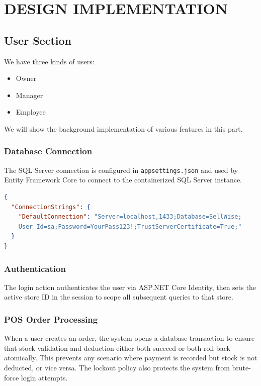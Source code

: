 \documentclass[12pt,a4paper]{report}
\begin{document}
\chapter{DESIGN IMPLEMENTATION}

\section{User Section}
We have three kinds of users:
\begin{itemize}
    \item Owner
    \item Manager
    \item Employee
\end{itemize}

We will show the background implementation of various features in this part.

\subsection{Database Connection}
The SQL Server connection is configured in \texttt{appsettings.json} and used by Entity Framework Core to connect to the containerized SQL Server instance.
\begin{lstlisting}[language=json, basicstyle=\small\ttfamily, backgroundcolor=\color{lightgray!20}]
{
  "ConnectionStrings": {
    "DefaultConnection": "Server=localhost,1433;Database=SellWise;
    User Id=sa;Password=YourPass123!;TrustServerCertificate=True;"
  }
}
\end{lstlisting}

\subsection{Authentication}
The login action authenticates the user via ASP.NET Core Identity, then sets the active store ID in the session to scope all subsequent queries to that store.

\subsection{POS Order Processing}
When a user creates an order, the system opens a database transaction to ensure that stock validation and deduction either both succeed or both roll back atomically. This prevents any scenario where payment is recorded but stock is not deducted, or vice versa. The lockout policy also protects the system from brute-force login attempts.
\end{document}
